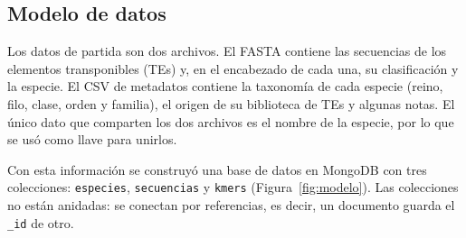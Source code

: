 \subsection*{Modelo de datos}

Los datos de partida son dos archivos. El FASTA contiene las secuencias
de los elementos transponibles (TEs) y, en el encabezado de cada una, su
clasificación y la especie. El CSV de metadatos contiene la taxonomía de
cada especie (reino, filo, clase, orden y familia), el origen de su
biblioteca de TEs y algunas notas. El único dato que comparten los dos
archivos es el nombre de la especie, por lo que se usó como llave para
unirlos.

Con esta información se construyó una base de datos en MongoDB con tres
colecciones: \texttt{especies}, \texttt{secuencias} y \texttt{kmers}
(Figura~\ref{fig:modelo}). Las colecciones no están anidadas: se
conectan por referencias, es decir, un documento guarda el \texttt{\_id}
de otro.

